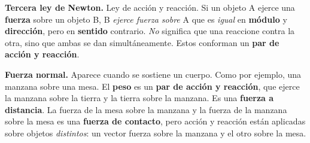 \documentclass{article}
\begin{document}
\textbf{Tercera ley de Newton.} Ley de acción y reacción. Si un objeto A ejerce 
una \textbf{fuerza} sobre un objeto B, B \textit{ejerce fuerza sobre} A que es 
\textit{igual} en \textbf{módulo} y \textbf{dirección}, pero en \textbf{sentido}
contrario. \textit{No} significa que una reaccione contra la otra, sino que
ambas se dan simultáneamente. 
Estos conforman un \textbf{par de acción y reacción}.

\textbf{Fuerza normal.} Aparece cuando se sostiene un cuerpo. Como por ejemplo,
una manzana sobre una mesa. El \textbf{peso} es un 
\textbf{par de acción y reacción}, que ejerce la manzana sobre la tierra y la 
tierra sobre la manzana. Es una \textbf{fuerza a distancia}. La fuerza de la 
mesa sobre la manzana y la fuerza de la manzana sobre la mesa es una 
\textbf{fuerza de contacto}, pero acción y reacción están aplicadas sobre 
objetos \textit{distintos}: un vector fuerza sobre la manzana y el otro sobre la
mesa.
\end{document}
